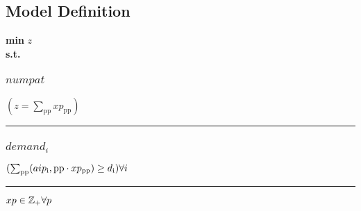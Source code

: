 \documentclass[11pt]{article}
\begin{document}
\subsection*{Model Definition}
\textbf{min} $z$\\
\textbf{s.t.}
\subsubsection*{$numpat$}
$
(z = \sum_\text{pp} xp_\text{pp})
$
\vspace{5pt}
\hrule
\subsubsection*{$demand_{i}$}
$
(\sum_\text{pp} (aip_\text{i},\text{pp} \cdot xp_\text{pp}) \geq d_\text{i})\hfill \forall i
$
\vspace{5pt}
\hrule
\bigskip
$xp\in \mathbb{Z}_{+} \forall p\\$
\end{document}
